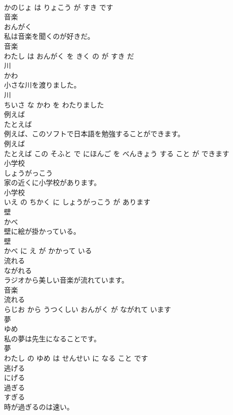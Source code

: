 \documentclass[8pt]{extreport}
\begin{document}
\begin{CJK}{UTF8}{min}
\\	かのじょ は りょこう が すき です			
\\	音楽	
\\	おんがく			
\\	私は音楽を聞くのが好きだ。	
\\	音楽 
\\	わたし は おんがく を きく の が すき だ			
\\	川	
\\	かわ			
\\	小さな川を渡りました。	
\\	川 
\\	ちいさ な かわ を わたりました			
\\	例えば	
\\	たとえば			
\\	例えば、このソフトで日本語を勉強することができます。	
\\	例えば 
\\	たとえば この そふと で にほんご を べんきょう する こと が できます			
\\	小学校	
\\	しょうがっこう			
\\	家の近くに小学校があります。	
\\	小学校 
\\	いえ の ちかく に しょうがっこう が あります			
\\	壁	
\\	かべ			
\\	壁に絵が掛かっている。	
\\	壁 
\\	かべ に え が かかって いる			
\\	流れる	
\\	ながれる			
\\	ラジオから美しい音楽が流れています。	
\\	音楽 
\\	流れる 
\\	らじお から うつくしい おんがく が ながれて います			
\\	夢	
\\	ゆめ			
\\	私の夢は先生になることです。	
\\	夢 
\\	わたし の ゆめ は せんせい に なる こと です			
\\	逃げる	
\\	にげる			
\\	過ぎる	
\\	すぎる			
\\	時が過ぎるのは速い。	

\end{CJK}
\end{document}
